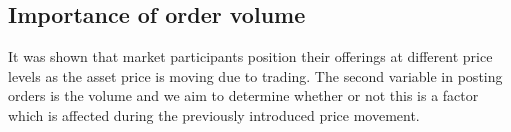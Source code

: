 
\subsection{Importance of order volume}
\label{sec:data-hypthesis-order-volume}

It was shown that market participants position their offerings at different price levels as the asset price is moving due to trading.
The second variable in posting orders is the volume and we aim to determine whether or not this is a factor which is affected during the previously introduced price movement.


